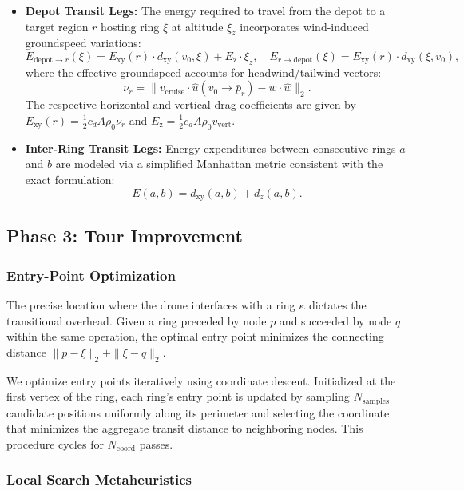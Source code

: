 \documentclass[12pt]{elsarticle}
\begin{document}
\begin{itemize}
	\item \textbf{Depot Transit Legs:} The energy required to travel from the depot to a target region $r$ hosting ring $\xi$ at altitude $\xi_z$ incorporates wind-induced groundspeed variations:
	\[
	E_{\text{depot}\to r}(\xi) = E_{\text{xy}}(r)\cdot d_{\text{xy}}(v_0,\xi) + E_{\text{z}}\cdot \xi_z, \quad E_{r\to\text{depot}}(\xi) = E_{\text{xy}}(r)\cdot d_{\text{xy}}(\xi,v_0),
	\]
	where the effective groundspeed accounts for headwind/tailwind vectors:
	\[
	\nu_r = \bigl\| v_{\text{cruise}}\cdot\hat{u}(v_0\to\bar{p}_r) - w\cdot\hat{w} \bigr\|_2.
	\]
	The respective horizontal and vertical drag coefficients are given by $E_{\text{xy}}(r) = \frac{1}{2}c_d A \rho_0 \nu_r$ and $E_{\text{z}} = \frac{1}{2}c_d A \rho_0 v_{\text{vert}}$.
	\item \textbf{Inter-Ring Transit Legs:} Energy expenditures between consecutive rings $a$ and $b$ are modeled via a simplified Manhattan metric consistent with the exact formulation:
	\[
	E(a,b) = d_{\text{xy}}(a,b) + d_z(a,b).
	\]
\end{itemize}

\subsection{Phase 3: Tour Improvement}

\subsubsection{Entry-Point Optimization}\label{sec:coord}

The precise location where the drone interfaces with a ring $\kappa$ dictates the transitional overhead. Given a ring preceded by node $p$ and succeeded by node $q$ within the same operation, the optimal entry point minimizes the connecting distance $\|p - \xi\|_2 + \|\xi - q\|_2$. 

We optimize entry points iteratively using coordinate descent. Initialized at the first vertex of the ring, each ring's entry point is updated by sampling $N_{\text{samples}}$ candidate positions uniformly along its perimeter and selecting the coordinate that minimizes the aggregate transit distance to neighboring nodes. This procedure cycles for $N_{\text{coord}}$ passes.

\subsubsection{Local Search Metaheuristics}\label{sec:ls}
\end{document}
